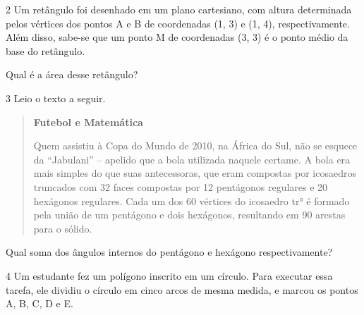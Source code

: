 {{{\begin{escolha}
{{{{\begin{escolha}
\begin{escolha}
{

\num{2} Um retângulo foi desenhado em um plano cartesiano, com altura
determinada pelos vértices dos pontos A e B de coordenadas (1, 3) e (1,
4), respectivamente. Além disso, sabe-se que um ponto M de
coordenadas (3, 3) é o ponto médio da base do retângulo.

Qual é a área desse retângulo?



\num{3} Leio o texto a seguir.

\begin{quote}
\textbf{Futebol e Matemática}

Quem assistiu à Copa do Mundo de 2010, na África do Sul, não se esquece
da ``Jabulani'' -- apelido que a bola utilizada naquele certame.  
A bola era mais simples do que suas antecessoras, que eram compostas
por icosaedros truncados com 32 faces compostas por
12 pentágonos regulares e 20 hexágonos regulares. Cada um dos 60
vértices do icosaedro tr° é formado pela união de um pentágono e
dois hexágonos, resultando em 90 arestas para o sólido.
\end{quote}

Qual soma dos ângulos internos do pentágono e hexágono respectivamente?



\num{4} Um estudante fez um polígono inscrito em um círculo. Para executar
essa tarefa, ele dividiu o círculo em cinco arcos de mesma medida, e
marcou os pontos A, B, C, D e E.

}
\end{escolha}
\end{escolha}}}}}
\end{escolha}}}}
